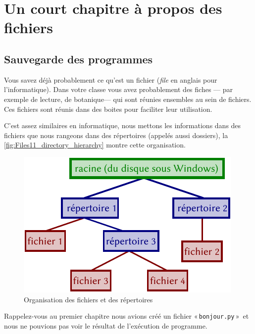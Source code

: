 



\chapter{Un court chapitre à propos des fichiers}\label{ch:ashortchapteraboutfiles}
\section{Sauvegarde des programmes}

Vous savez déjà probablement ce qu'est un fichier (\emph{file} en anglais pour l'informatique).
Dans votre classe vous avez probablement des fiches --- par exemple de lecture, de botanique--- qui sont réunies ensembles au sein de fichiers. Ces fichiers sont réunis dans des boites pour faciliter leur utilisation.

C'est assez similaires en informatique, nous mettons les informations dans des fichiers que nous rangeons dans des répertoires (appelés aussi dossiers), la \autoref{fig:Files11_directory_hierarchy} montre cette organisation.

\begin{figure}[h!]
\centering
\includegraphics[scale=1]{images/Files11_directory_hierarchy.pdf}
\caption{Organisation des fichiers et des répertoires}\label{fig:Files11_directory_hierarchy}
\end{figure}


Rappelez-vous au premier chapitre nous avions créé un fichier « \texttt{bonjour.py} »  et nous ne pouvions pas voir le résultat de l'exécution de programme.

